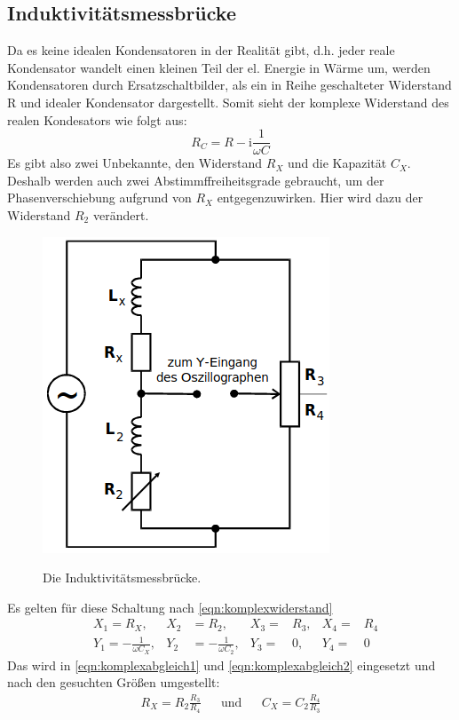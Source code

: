 \documentclass[titlepage = firstcover]{scrartcl}
\begin{document}
          \subsection{Induktivitätsmessbrücke}
          Da es keine idealen Kondensatoren in der Realität gibt, d.h. jeder reale Kondensator wandelt einen kleinen Teil der el. Energie in Wärme um,
          werden Kondensatoren durch Ersatzschaltbilder, als ein in Reihe geschalteter Widerstand R und idealer Kondensator dargestellt. Somit sieht der
          komplexe Widerstand des realen Kondesators wie folgt aus:
          \begin{equation}
            R_C = R - \text{i} \frac{1}{\omega C}
          \end{equation}
          Es gibt also zwei Unbekannte, den Widerstand $R_X$ und die Kapazität $C_X$. Deshalb werden auch zwei Abstimmffreiheitsgrade gebraucht, um der
          Phasenverschiebung aufgrund von $R_X$ entgegenzuwirken. Hier wird dazu der Widerstand $R_2$ verändert.
          \begin{figure}[h]
            \centering
            \caption{Die Induktivitätsmessbrücke.}
            \includegraphics[width = 0.4\linewidth]{Induktivitaetsmessbruecke.png}
            \label{fig:wheatstone}
          \end{figure}
          Es gelten für diese Schaltung nach \eqref{eqn:komplexwiderstand}
          \begin{align*}
            &X_1 = R_X, & X_2 &= R_2, & X_3 =& R_3, & X_4 =& R_4 \\
            &Y_1 = -\frac{1}{\omega C_X}, & Y_2 &= -\frac{1}{\omega C_2}, & Y_3 =& 0, & Y_4 =& 0
          \end{align*}
          Das wird in \eqref{eqn:komplexabgleich1} und \eqref{eqn:komplexabgleich2} eingesetzt und nach den gesuchten Größen umgestellt:
          \begin{align*}
            R_X = R_2 \frac{R_3}{R_4} &&\text{und}&& C_X = C_2 \frac{R_4}{R_3}            
          \end{align*}
\end{document}
